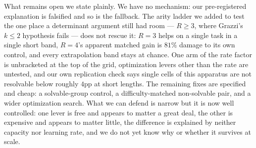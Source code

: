 \documentclass[10pt,twocolumn]{article}
\begin{document}
What remains open we state plainly. We have no mechanism: our pre-registered
explanation is falsified and so is the fallback. The arity ladder we added to
test the one place a determinant argument still had room --- $R\ge3$, where
Grazzi's $k\le2$ hypothesis fails --- does not rescue it: $R{=}3$ helps on a
single task in a single short band, $R{=}4$'s apparent matched gain is $81\%$
damage to its own control, and every extrapolation band stays at chance.
One arm of the rate factor is unbracketed at the top of the grid, optimization
levers other than the rate are untested, and our own replication check says
single cells of this apparatus are not resolvable below roughly $4$pp at short
lengths. The remaining fixes are specified and cheap: a solvable-group control,
a difficulty-matched non-solvable pair, and a wider optimization search. What we
can defend is narrow but it is
now well controlled: one lever is free and appears to matter a great deal, the
other is expensive and appears to matter little, the difference is explained by
neither capacity nor learning rate, and we do not yet know why or whether it
survives at scale.
\end{document}
